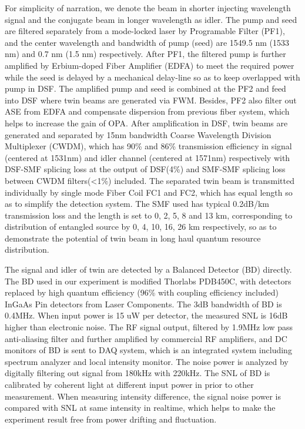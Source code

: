 \documentclass[9pt,twocolumn,twoside]{osajnl}
\begin{document}
For simplicity of narration, we denote the beam in shorter injecting wavelength signal and the conjugate beam in longer wavelength as idler.
The pump and seed are filtered separately from a mode-locked laser by Programable Filter (PF1), and the center wavelength and bandwidth of pump (seed) are 1549.5 nm (1533 nm) and 0.7 nm (1.5 nm) respectively.
After PF1, the filtered pump is further amplified by Erbium-doped Fiber Amplifier (EDFA) to meet the required power while the seed is delayed by a mechanical delay-line so as to keep overlapped with pump in DSF.
The amplified pump and seed is combined at the PF2 and feed into DSF where twin beams are generated via FWM.
Besides, PF2 also filter out ASE from EDFA and compensate dispersion from previous fiber system, which helps to increase the gain of OPA.
After amplification in DSF, twin beams are generated and separated by 15nm bandwidth Coarse Wavelength Division Multiplexer (CWDM), which has 90\% and 86\% transmission efficiency in signal (centered at 1531nm) and idler channel (centered at 1571nm)  respectively with DSF-SMF splicing loss at the output of DSF(4\%) and SMF-SMF splicing loss between CWDM filters(<1\%) included.
The separated twin beam is transmitted individually by single mode Fiber Coil FC1 and FC2, which has equal length so as to simplify the detection system.
The SMF used has typical 0.2dB/km transmission loss and the length is set to 0, 2, 5, 8 and 13 km, corresponding to distribution of entangled source by 0, 4, 10, 16, 26 km respectively, so as to demonstrate the potential of twin beam in long haul quantum resource distribution.

The signal and idler of twin are detected by a Balanced Detector (BD) directly.
The BD used in our experiment is modified Thorlabs PDB450C, with detectors replaced by high quantum efficiency (96\% with coupling efficiency included) InGaAs Pin detectors from Laser Components.
The 3dB bandwidth of BD is 0.4MHz. When input power is 15 uW per detector, the measured SNL is 16dB higher than electronic noise.
The RF signal output, filtered by 1.9MHz low pass anti-aliasing filter and further amplified by commercial RF amplifiers, and DC monitors of BD is sent to DAQ system, which is an integrated system including spectrum analyzer and local intensity monitor.
The noise power is analyzed by digitally filtering out signal from 180kHz with 220kHz.
The SNL of BD is calibrated by coherent light at different input power in prior to other measurement.
When measuring intensity difference, the signal noise power is compared with SNL at same intensity in realtime, which helps to make the experiment result free from power drifting and fluctuation.
\end{document}
